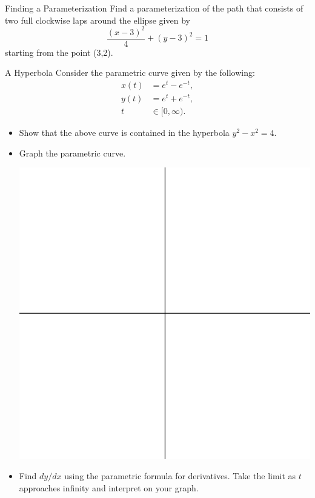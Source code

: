 \begin{exercise}{Finding a Parameterization \Coffeecup \Coffeecup \Coffeecup}
 Find a parameterization of the path that consists of two full clockwise laps around the ellipse given by $$ \frac{(x-3)^2}{4}+(y-3)^2=1$$
starting from the point (3,2).
\vspace*{1in}
\end{exercise}

\begin{exercise}{A Hyperbola \Coffeecup \Coffeecup}
Consider the parametric curve given by the following: \begin{align*} x(t)&=e^t-e^{-t}, \\
y(t)&=e^t+e^{-t}, \\ t&\in [0,\infty).
\end{align*}
\begin{itemize}
\item Show that the above curve is contained in the hyperbola $y^2-x^2=4$.
\vspace*{2in}
\item Graph the parametric curve.
\begin{center}
\includegraphics[scale=0.8]{quadall}
\end{center}
\item Find $dy/dx$ using the parametric formula for derivatives.  Take the limit as $t$ approaches infinity and interpret on your graph.
\vspace*{2in}
\end{itemize}
\end{exercise}

